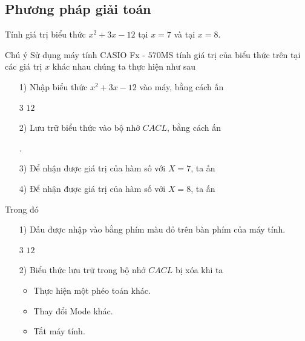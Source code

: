 \subsection{Phương pháp giải toán}
\begin{vd}%
	Tính giá trị biểu thức $x^2+3x-12$ tại $x=7$ và tại $x=8$.
\end{vd}

\begin{note}{Chú ý}
	Sử dụng máy tính CASIO Fx - $570$MS tính giá trị của biểu thức trên tại các giá trị $x$ khác nhau chúng ta thực hiện như sau
	\begin{itemize}
		\item[1)] Nhập biểu thức $x^2+3x-12$ vào máy, bằng cách ấn
		\begin{center}
		   \fbox{$+$} $3$  \fbox{$-$} $12$
		\end{center}
		\item[2)] Lưu trữ biểu thức vào bộ nhớ $CACL$, bằng cách ấn 
		\begin{center}
			.
		\end{center}
		\item[3)] Để nhận được giá trị của hàm số với $X=7$, ta ấn 
		\begin{center}
			 \fbox{=} \qquad \qquad \qquad \fbox{\qquad 58}
		\end{center}
	\item[4)] Để nhận được giá trị của hàm số với $X=8$, ta ấn 
	\begin{center}
		  \fbox{=} \qquad \qquad {}
	\end{center}
	\end{itemize}
Trong đó
\begin{itemize}
	\item[1)] Dấu \fbox{=} được nhập vào bằng phím màu đỏ trên bàn phím của máy tính.
	\begin{center}
		   \fbox{$+$} $3$  \fbox{$-$} $12$
	\end{center}
	\item[2)] Biểu thức lưu trữ trong bộ nhớ $CACL$ bị xóa khi ta
	\begin{itemize}
		\item Thực hiện một phéo toán khác.
		\item Thay đổi Mode khác.
		\item Tắt máy tính.
	\end{itemize}
\end{itemize}
\end{note}


